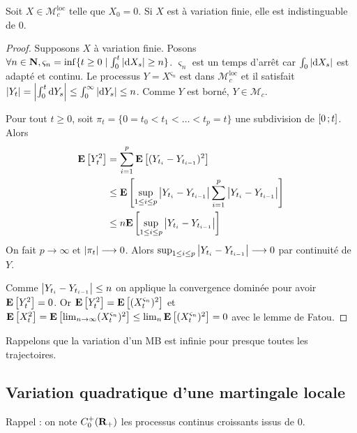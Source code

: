 	\begin{thm}
		Soit $X \in \mathcal{M}^{\text{loc}}_c$ telle que $X_0 = 0$.
		Si $X$ est à variation finie, elle est indistinguable de $0$.
	\end{thm}
	
	\begin{proof}
		Supposons $X$ à variation finie.
		Posons $\forall n \in \mathbf{N}, \varsigma_n = \inf \{ t \geq 0 \mid \int_0^t \left\lvert\mathop{}\mathopen{}\mathrm{d} X_s\right\rvert \geq n \}$.
		$\varsigma_n$ est un temps d'arrêt car $\int_0 \left\lvert\mathop{}\mathopen{}\mathrm{d} X_s\right\rvert$ est adapté et continu.
		Le processus $Y = X^{\varsigma_n}$ est dans $\mathcal{M}^{\text{loc}}_c$ et il satisfait $\left\lvert Y_t\right\rvert = \left\lvert\int_0^t \mathop{}\mathopen{}\mathrm{d} Y_s\right\rvert \leq \int_0^\infty \left\lvert\mathop{}\mathopen{}\mathrm{d} Y_s\right\rvert \leq n$.
		Comme $Y$ est borné, $Y \in \mathcal{M}_c$.
		
		Pour tout $t \geq 0$, soit $\pi_t = \{ 0 = t_0 < t_1 < \ldots < t_p = t \}$ une subdivision de $\mathopen{}\mathclose{\left[0\mathclose{}\mathpunct{};t\right]}$.
		Alors
		\begin{align*}
		\mathbf{E} \left[ Y_t^2 \right] & = \sum_{i = 1}^p \mathbf{E} \left[ (Y_{t_i} - Y_{t_{i - 1}})^2 \right] \\
		                          & \leq \mathbf{E} \left[ \sup_{1 \leq i \leq p} \left\lvert Y_{t_i} - Y_{t_{i - 1}}\right\rvert \sum_{i = 1}^p \left\lvert Y_{t_i} - Y_{t_{i - 1}}\right\rvert \right] \\
		                          & \leq n \mathbf{E} \left[ \sup_{1 \leq i \leq p} \left\lvert Y_{t_i} - Y_{t_{i - 1}}\right\rvert \right]
		\end{align*}
		On fait $p \longrightarrow \infty$ et $\left\lvert\pi_t\right\rvert \longrightarrow 0$.
		Alors $\sup_{1 \leq i \leq p} \left\lvert Y_{t_i} - Y_{t_{i - 1}}\right\rvert \longrightarrow 0$ par continuité de $Y$.
		
		Comme $\left\lvert Y_{t_i} - Y_{t_{i - 1}}\right\rvert \leq n$ on applique la convergence dominée pour avoir $\mathbf{E} \left[ Y_t^2 \right] = 0$.
		Or $\mathbf{E} \left[ Y_t^2 \right] = \mathbf{E} \left[ (X_t^{\varsigma_n})^2 \right]$ et $\mathbf{E} \left[ X_t^2 \right] = \mathbf{E} \left[ \lim_{n \to \infty} (X_t^{\varsigma_n})^2 \right] \leq \lim_n \mathbf{E} \left[ (X_t^{\varsigma_n})^2 \right] = 0$ avec le lemme de Fatou.
	\end{proof}
	
	Rappelons que la variation d'un MB est infinie pour presque toutes les trajectoires.


\subsection{Variation quadratique d'une martingale locale}

	Rappel : on note $C_0^+(\mathbf{R}_+)$ les processus continus croissants issus de $0$.
	
